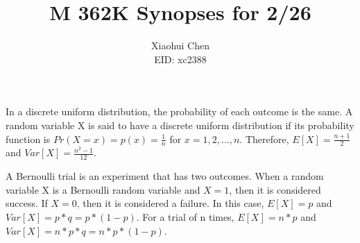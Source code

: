 \documentclass[12pt]{article}
\author{Xiaohui Chen \\EID: xc2388}
\title{M 362K Synopses for 2/26}
\begin{document}
\maketitle
\begin{spacing}{2.0}

In a discrete uniform distribution, the probability of each outcome is the same. A random variable X is said to have a discrete uniform distribution if its probability function is $Pr(X=x)=p(x)=\frac{1}{n}$ for $x=1,2,\ldots, n$. Therefore, $E[X]=\frac{n+1}{2}$ and $Var[X]= \frac{n^2-1}{12}$. 

A Bernoulli trial is an experiment that has two outcomes. When a random variable X is a Bernoulli random variable and $X=1$, then it is considered success. If $X=0$, then it is considered a failure. In this case, $E[X]=p$ and $Var[X]=p*q=p*(1-p)$. For a trial of n times, $E[X]=n*p$ and $Var[X]=n*p*q=n*p*(1-p)$. 

\end{spacing}
\end{document}
